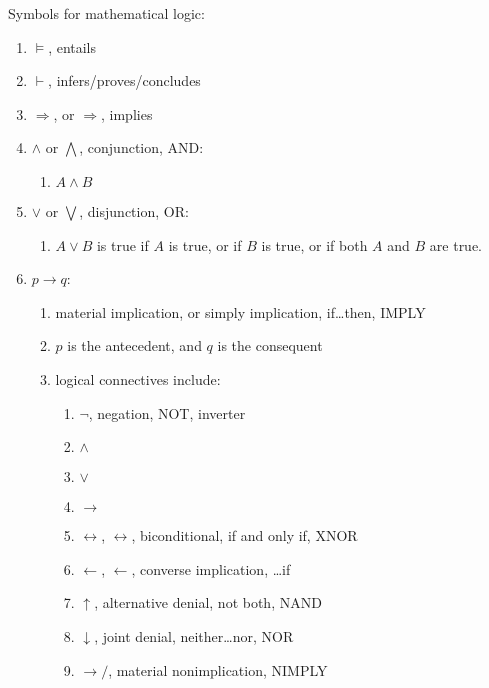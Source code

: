 Symbols for mathematical logic: \vspace{-0.3cm}
\begin{enumerate} \itemsep -4pt
\item $\models$, entails
\item $\vdash$, infers/proves/concludes
\item $\Rightarrow$, or $\Longrightarrow$, implies
\item $\land$ or $\bigwedge$, conjunction, AND: \vspace{-0.3cm}
	\begin{enumerate} \itemsep -2pt
	\item $A\land B$
	\end{enumerate}
\item $\lor$ or $\bigvee$, disjunction, OR: \vspace{-0.3cm}
	\begin{enumerate} \itemsep -2pt
	\item $A\lor B$ is true if ${\displaystyle A}$ is true, or if ${\displaystyle B}$ is true, or if both ${\displaystyle A}$ and ${\displaystyle B}$ are true.
	\end{enumerate}
\item $p \rightarrow q$: \vspace{-0.3cm}
	\begin{enumerate} \itemsep -2pt
	\item material implication, or simply implication, if\dots then, IMPLY
	\item $p$ is the antecedent, and $q$ is the consequent
	\item logical connectives include: \vspace{-0.2cm}
		\begin{enumerate} \itemsep -2pt
		\item $\neg$, negation, NOT, inverter
		\item $\land$
		\item $\lor$
		\item $\rightarrow$
		\item $\leftrightarrow$, $\longleftrightarrow$, biconditional, if and only if, XNOR
		\item $\leftarrow$, $\longleftarrow$, converse implication, \dots if
		\item $\uparrow$, alternative denial, not both, NAND
		\item $\downarrow$, joint denial, neither\dots nor, NOR
		\item $\rightarrow/$, material nonimplication, NIMPLY
		\end{enumerate}
	\end{enumerate}
\end{enumerate}





